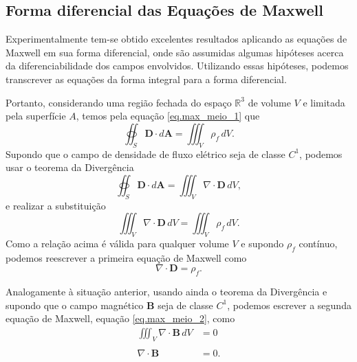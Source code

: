 \subsection{Forma diferencial das Equa\c{c}\~oes de Maxwell}

Experimentalmente tem-se obtido excelentes resultados aplicando as equa\c{c}\~oes de Maxwell em sua forma diferencial, onde s\~ao assumidas algumas hip\'oteses acerca da diferenciabilidade dos campos envolvidos. Utilizando essas hip\'oteses, podemos transcrever as equa\c{c}\~oes da forma integral para a forma diferencial.

Portanto, considerando uma regi\~ao fechada do espa\c{c}o $\mathbb{R}^3$ de volume $V$ e limitada pela superf\'icie $A$, temos pela equa\c{c}\~ao \ref{eq.max_meio_1} que
\begin{equation*}
\oiint_S\mathbf{D}\cdot d\mathbf{A}=\iiint_{V}\rho_f\,dV.
\end{equation*}
Supondo que o campo de densidade de fluxo el\'etrico seja de classe $C^1$, podemos usar o teorema da Diverg\^encia
\begin{equation*}
\oiint_S\mathbf{D}\cdot d\mathbf{A}=\iiint_V\nabla\cdot\mathbf{D}\,dV,
\end{equation*}
e realizar a substitui\c{c}\~ao
\begin{equation*}
\iiint_V\nabla\cdot\mathbf{D}\,dV=\iiint_{V}\rho_f\,dV.
\end{equation*}
Como a rela\c{c}\~ao acima \'e v\'alida para qualquer volume $V$ e supondo $\rho_f$ cont\'inuo, podemos reescrever a primeira equa\c{c}\~ao de Maxwell como
\begin{equation*}
\nabla\cdot\mathbf{D}=\rho_f.
\end{equation*}

Analogamente \`a situa\c{c}\~ao anterior, usando ainda o teorema da Diverg\^encia e supondo que o campo magn\'etico $\mathbf{B}$ seja de classe $C^1$, podemos escrever a segunda equa\c{c}\~ao de Maxwell, equa\c{c}\~ao \ref{eq.max_meio_2}, como
\begin{align*}
\iiint_V\nabla\cdot\mathbf{B}\,dV&=0\\\\
\nabla\cdot\mathbf{B}&=0.
\end{align*}

